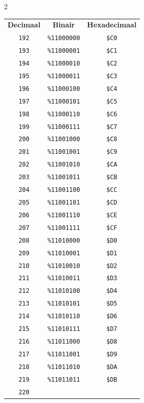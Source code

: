\begin{multicols}{2}  
\begin{center}
 \begin{tabular}{|c|c|c|}
  \hline
		\textbf{Decimaal} & \textbf{Binair} & \textbf{Hexadecimaal} \\ \hhline{|=|=|=|}       \texttt{192} & \texttt{\%11000000} &  \texttt{\$C0} \\ \hline  \texttt{193} & \texttt{\%11000001} &  \texttt{\$C1} \\ \hline  \texttt{194} & \texttt{\%11000010} &  \texttt{\$C2} \\ \hline  \texttt{195} & \texttt{\%11000011} &  \texttt{\$C3} \\ \hline  \texttt{196} & \texttt{\%11000100} &  \texttt{\$C4} \\ \hline  \texttt{197} & \texttt{\%11000101} &  \texttt{\$C5} \\ \hline  \texttt{198} & \texttt{\%11000110} &  \texttt{\$C6} \\ \hline  \texttt{199} & \texttt{\%11000111} &  \texttt{\$C7} \\ \hline  \texttt{200} & \texttt{\%11001000} &  \texttt{\$C8} \\ \hline  \texttt{201} & \texttt{\%11001001} &  \texttt{\$C9} \\ \hline  \texttt{202} & \texttt{\%11001010} &  \texttt{\$CA} \\ \hline  \texttt{203} & \texttt{\%11001011} &  \texttt{\$CB} \\ \hline  \texttt{204} & \texttt{\%11001100} &  \texttt{\$CC} \\ \hline  \texttt{205} & \texttt{\%11001101} &  \texttt{\$CD} \\ \hline  \texttt{206} & \texttt{\%11001110} &  \texttt{\$CE} \\ \hline  \texttt{207} & \texttt{\%11001111} &  \texttt{\$CF} \\ \hline  \texttt{208} & \texttt{\%11010000} &  \texttt{\$D0} \\ \hline  \texttt{209} & \texttt{\%11010001} &  \texttt{\$D1} \\ \hline  \texttt{210} & \texttt{\%11010010} &  \texttt{\$D2} \\ \hline  \texttt{211} & \texttt{\%11010011} &  \texttt{\$D3} \\ \hline  \texttt{212} & \texttt{\%11010100} &  \texttt{\$D4} \\ \hline  \texttt{213} & \texttt{\%11010101} &  \texttt{\$D5} \\ \hline  \texttt{214} & \texttt{\%11010110} &  \texttt{\$D6} \\ \hline  \texttt{215} & \texttt{\%11010111} &  \texttt{\$D7} \\ \hline  \texttt{216} & \texttt{\%11011000} &  \texttt{\$D8} \\ \hline  \texttt{217} & \texttt{\%11011001} &  \texttt{\$D9} \\ \hline  \texttt{218} & \texttt{\%11011010} &  \texttt{\$DA} \\ \hline  \texttt{219} & \texttt{\%11011011} &  \texttt{\$DB} \\ \hline  \texttt{220} & 
\end{tabular}
\end{center}
\end{multicols}
